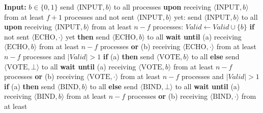 \begin{algorithm}
    \caption{Implementation of GBCA. Algorithm 6 of Abraham, Ben-David and
      Yandamuri \cite{ABDY22}, transcribed in full: six rounds, the message
      levels INPUT, ECHO, VOTE, BIND, ECHO5, and that algorithm's three decide
      conditions (D18). The source blueprint's own GBCA pseudocode is a
      four-round compression of this one --- the ECHO5 level elided, the decide
      conditions read one level down, and $f{+}1$ received VOTE-$b$ messages in
      place of $f{+}1$ received BIND-$b$ messages as the grade-1 witness --- and that compression
      violates Binding, so the encoding follows the cited algorithm instead}
    \label{alg:gbca-impl}
    \begin{algorithmic}
        \State \textbf{Input:} $b \in \{0,1\}$
        \medskip
        \State send $\langle\mathrm{INPUT}, b\rangle$ to all processes
        \State \textbf{upon} receiving $\langle\mathrm{INPUT}, b\rangle$ from at
          least $f + 1$ processes and not sent $\langle\mathrm{INPUT}, b\rangle$ yet:
        \State\quad send $\langle\mathrm{INPUT}, b\rangle$ to all
        \State \textbf{upon} receiving $\langle\mathrm{INPUT}, b\rangle$ from at
          least $n - f$ processes:
        \State\quad $\mathit{Valid} \gets \mathit{Valid} \cup \{b\}$
        \State\quad \textbf{if} not sent $\langle\mathrm{ECHO}, \cdot\rangle$ yet
          \textbf{then} send $\langle\mathrm{ECHO}, b\rangle$ to all
        \State \textbf{wait until}
        \State\quad (a) receiving $\langle\mathrm{ECHO}, b\rangle$ from at least
          $n - f$ processes \textbf{or}
        \State\quad (b) receiving $\langle\mathrm{ECHO}, \cdot\rangle$ from at least
          $n - f$ processes and $|\mathit{Valid}| > 1$
        \State\quad \textbf{if} (a) \textbf{then} send $\langle\mathrm{VOTE}, b\rangle$
          to all \textbf{else} send $\langle\mathrm{VOTE}, \bot\rangle$ to all
        \State \textbf{wait until}
        \State\quad (a) receiving $\langle\mathrm{VOTE}, b\rangle$ from at least
          $n - f$ processes \textbf{or}
        \State\quad (b) receiving $\langle\mathrm{VOTE}, \cdot\rangle$ from at least
          $n - f$ processes and $|\mathit{Valid}| > 1$
        \State\quad \textbf{if} (a) \textbf{then} send $\langle\mathrm{BIND}, b\rangle$
          to all \textbf{else} send $\langle\mathrm{BIND}, \bot\rangle$ to all
        \State \textbf{wait until}
        \State\quad (a) receiving $\langle\mathrm{BIND}, b\rangle$ from at least
          $n - f$ processes \textbf{or}
        \State\quad (b) receiving $\langle\mathrm{BIND}, \cdot\rangle$ from at least

\end{algorithmic}
\end{algorithm}
